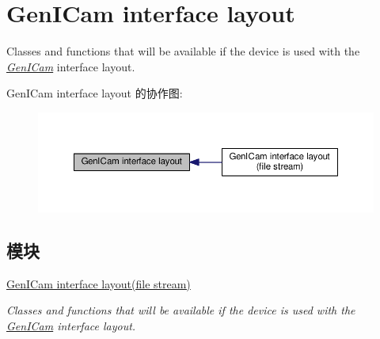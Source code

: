 \hypertarget{group___gen_i_cam_interface}{\section{Gen\+I\+Cam interface layout}
\label{group___gen_i_cam_interface}
}


Classes and functions that will be available if the device is used with the {\itshape \hyperlink{namespacemv_i_m_p_a_c_t_1_1acquire_1_1_gen_i_cam}{Gen\+I\+Cam}} interface layout.  


Gen\+I\+Cam interface layout 的协作图\+:
\nopagebreak
\begin{figure}[H]
\begin{center}
\leavevmode
\includegraphics[width=350pt]{group___gen_i_cam_interface}
\end{center}
\end{figure}
\subsection*{模块}
\begin{DoxyCompactItemize}
\item 
\hyperlink{group___gen_i_cam_interface_file_stream}{Gen\+I\+Cam interface layout(file stream)}
\begin{DoxyCompactList}\small\item\em Classes and functions that will be available if the device is used with the {\itshape \hyperlink{namespacemv_i_m_p_a_c_t_1_1acquire_1_1_gen_i_cam}{Gen\+I\+Cam}} interface layout. \end{DoxyCompactList}\end{DoxyCompactItemize}
